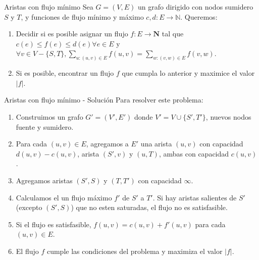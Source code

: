 \documentclass{beamer}
\begin{document}

\begin{frame}{Aristas con flujo mínimo}
    Sea $G = (V,E)$ un grafo dirigido con nodos sumidero $S$ y $T$, y funciones de flujo mínimo y máximo $c,d: E \to \mathbb{N}$.
    Queremos:
    \begin{enumerate}
        \item Decidir si es posible asignar un flujo $f: E \to \textbf{N}$ tal que $c(e) \leq f(e) \leq d(e) \forall e \in E$ y $\forall v \in V - \{S,T\}, \sum_{u: (u,v) \in E} f(u,v) = \sum_{w: (v,w) \in E} f(v,w)$.
        \item Si es posible, encontrar un flujo $f$ que cumpla lo anterior y maximice el valor $|f|$.
    \end{enumerate}
\end{frame}

\begin{frame}{Aristas con flujo mínimo - Solución}
    Para resolver este problema:
    \begin{enumerate}
        \item Construimos un grafo $G' = (V', E')$ donde $V' = V \cup \{S', T'\}$, nuevos nodos fuente y sumidero.
        \pause
        \item Para cada $(u,v) \in E$, agregamos a $E'$ una arista $(u,v)$ con capacidad $d(u,v) - c(u,v)$, arista $(S',v)$ y $(u,T)$, ambas con capacidad $c(u,v)$.
        \pause
        \item Agregamos aristas $(S',S)$ y $(T,T')$ con capacidad $\infty$.
        \item Calculamos el un flujo máximo $f'$ de $S'$ a $T'$. Si hay aristas salientes de $S'$ (excepto $(S',S)$) que no esten saturadas, el flujo no es satisfasible.
        \pause 
        \item Si el flujo es satisfasible, $f(u,v) = c(u,v) + f'(u,v)$ para cada $(u,v) \in E$.
        \item El flujo $f$ cumple las condiciones del problema y maximiza el valor $|f|$.
    \end{enumerate}
\end{frame}
\end{document}
